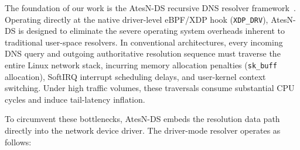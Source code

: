 \documentclass[a4paper,fleqn,colorlinks,hidelinks]{cas-sc}
\begin{document}
The foundation of our work is the AtesN-DS recursive DNS resolver framework~\citep{sbesc_estendido}. Operating directly at the native driver-level eBPF/XDP hook (\texttt{XDP\_DRV}), AtesN-DS is designed to eliminate the severe operating system overheads inherent to traditional user-space resolvers. In conventional architectures, every incoming DNS query and outgoing authoritative resolution sequence must traverse the entire Linux network stack, incurring memory allocation penalties (\texttt{sk\_buff} allocation), SoftIRQ interrupt scheduling delays, and user-kernel context switching. Under high traffic volumes, these traversals consume substantial CPU cycles and induce tail-latency inflation.

To circumvent these bottlenecks, AtesN-DS embeds the resolution data path directly into the network device driver. The driver-mode resolver operates as follows:
\end{document}
